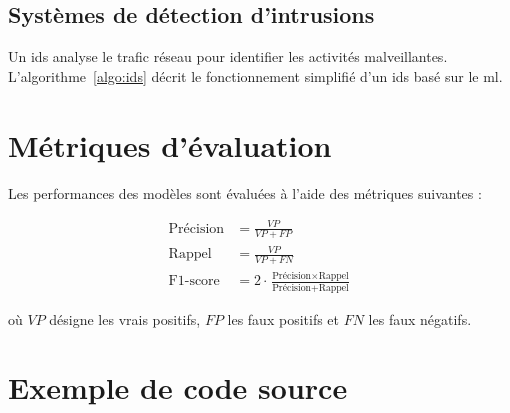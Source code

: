 \subsection{Systèmes de détection d'intrusions}

Un \gls{ids} analyse le trafic réseau pour identifier les activités malveillantes. L'algorithme~\ref{algo:ids} décrit le fonctionnement simplifié d'un \gls{ids} basé sur le \gls{ml}.

\begin{algorithm}[H]
  \caption{Détection d'intrusions par apprentissage supervisé}
  \label{algo:ids}

\end{algorithm}

\section{Métriques d'évaluation}
\label{sec:metriques}

Les performances des modèles sont évaluées à l'aide des métriques suivantes :

\begin{align}
  \text{Précision}   &= \frac{VP}{VP + FP} \label{eq:precision} \\[6pt]
  \text{Rappel}      &= \frac{VP}{VP + FN} \label{eq:rappel} \\[6pt]
  \text{F1-score}    &= 2 \cdot \frac{\text{Précision} \times \text{Rappel}}{\text{Précision} + \text{Rappel}} \label{eq:f1}
\end{align}

où $VP$ désigne les vrais positifs, $FP$ les faux positifs et $FN$ les faux négatifs.

\section{Exemple de code source}
\label{sec:code}

